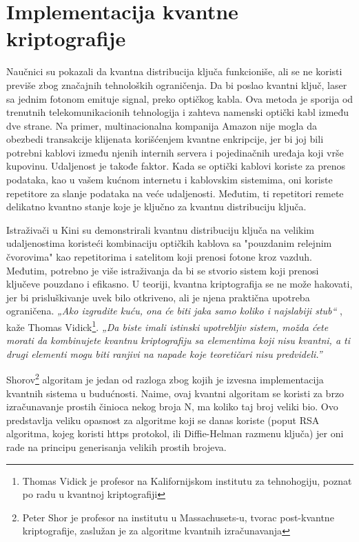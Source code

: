 \documentclass[a4paper]{article}
\begin{document}
{\section{Implementacija kvantne kriptografije}
Naučnici su pokazali da kvantna distribucija ključa funkcioniše, ali se ne koristi previše zbog značajnih tehnoloških ograničenja. Da bi poslao kvantni ključ, laser sa jednim fotonom emituje signal, preko optičkog kabla. Ova metoda je sporija od trenutnih telekomunikacionih tehnologija i zahteva namenski optički kabl između dve strane. Na primer, multinacionalna kompanija Amazon nije mogla da obezbedi transakcije klijenata korišćenjem kvantne enkripcije, jer bi joj bili potrebni kablovi između njenih internih servera i pojedinačnih uređaja koji vrše kupovinu. Udaljenost je takođe faktor. Kada se optički kablovi koriste za prenos podataka, kao u vašem kućnom internetu i kablovskim sistemima, oni koriste repetitore za slanje podataka na veće udaljenosti. Međutim, ti repetitori remete delikatno kvantno stanje koje je ključno za kvantnu distribuciju ključa.

Istraživači u Kini\cite{jenniferkvantna} su demonstrirali kvantnu distribuciju ključa na velikim udaljenostima koristeći kombinaciju optičkih kablova sa "pouzdanim relejnim čvorovima" kao repetitorima i satelitom koji prenosi fotone kroz vazduh. Međutim, potrebno je više istraživanja da bi se stvorio sistem koji prenosi ključeve pouzdano i efikasno.
U teoriji, kvantna kriptografija se ne može hakovati, jer bi prisluškivanje uvek bilo otkriveno, ali je njena praktična upotreba ograničena. \emph{„Ako izgradite kuću, ona će biti jaka samo koliko i najslabiji stub“} , kaže Thomas Vidick\footnote{Thomas Vidick je profesor na Kalifornijskom institutu za tehnohogiju, poznat po radu u kvantnoj kriptografiji}. \emph{„Da biste imali istinski upotrebljiv sistem, možda ćete morati da kombinujete kvantnu kriptografiju sa elementima koji nisu kvantni, a ti drugi elementi mogu biti ranjivi na napade koje teoretičari nisu predvideli.”}

Shorov\footnote{Peter Shor je profesor na institutu u Massachusets-u, tvorac post-kvantne kriptografije, zaslužan je za algoritme kvantnih izračunavanja} algoritam\cite{eduardshor}  je jedan od razloga zbog kojih je izvesna implementacija kvantnih sistema u budućnosti. Naime, ovaj kvantni algoritam se koristi za brzo izračunavanje prostih činioca nekog broja N, ma koliko taj broj veliki bio. Ovo predstavlja veliku opasnost za algoritme koji se danas koriste (poput RSA algoritma, kojeg koristi https protokol, ili Diffie-Helman razmenu ključa) jer oni rade na principu generisanja velikih prostih brojeva.

}
\end{document}
